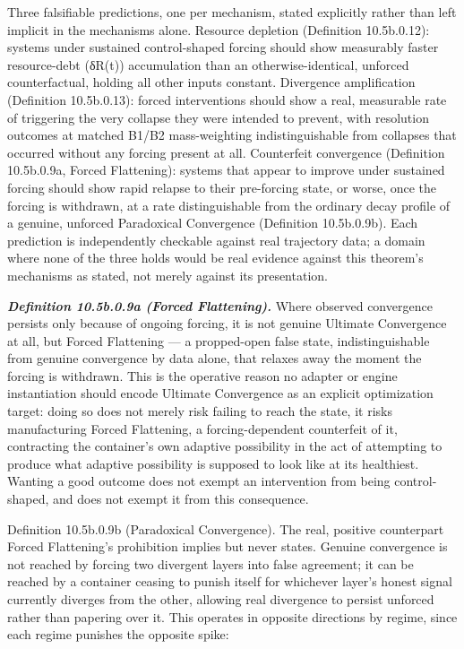 \documentclass[
]{article}
\begin{document}
Three falsifiable predictions, one per mechanism, stated explicitly
rather than left implicit in the mechanisms alone. Resource depletion
(Definition 10.5b.0.12): systems under sustained control-shaped forcing
should show measurably faster resource-debt (δR(t)) accumulation than an
otherwise-identical, unforced counterfactual, holding all other inputs
constant. Divergence amplification (Definition 10.5b.0.13): forced
interventions should show a real, measurable rate of triggering the very
collapse they were intended to prevent, with resolution outcomes at
matched B1/B2 mass-weighting indistinguishable from collapses that
occurred without any forcing present at all. Counterfeit convergence
(Definition 10.5b.0.9a, Forced Flattening): systems that appear to
improve under sustained forcing should show rapid relapse to their
pre-forcing state, or worse, once the forcing is withdrawn, at a rate
distinguishable from the ordinary decay profile of a genuine, unforced
Paradoxical Convergence (Definition 10.5b.0.9b). Each prediction is
independently checkable against real trajectory data; a domain where
none of the three holds would be real evidence against this theorem's
mechanisms as stated, not merely against its presentation.

\emph{\textbf{Definition 10.5b.0.9a (Forced Flattening).}} Where
observed convergence persists only because of ongoing forcing, it is not
genuine Ultimate Convergence at all, but Forced Flattening --- a
propped-open false state, indistinguishable from genuine convergence by
data alone, that relaxes away the moment the forcing is withdrawn. This
is the operative reason no adapter or engine instantiation should encode
Ultimate Convergence as an explicit optimization target: doing so does
not merely risk failing to reach the state, it risks manufacturing
Forced Flattening, a forcing-dependent counterfeit of it, contracting
the container's own adaptive possibility in the act of attempting to
produce what adaptive possibility is supposed to look like at its
healthiest. Wanting a good outcome does not exempt an intervention from
being control-shaped, and does not exempt it from this consequence.

Definition 10.5b.0.9b (Paradoxical Convergence). The real, positive
counterpart Forced Flattening's prohibition implies but never states.
Genuine convergence is not reached by forcing two divergent layers into
false agreement; it can be reached by a container ceasing to punish
itself for whichever layer's honest signal currently diverges from the
other, allowing real divergence to persist unforced rather than papering
over it. This operates in opposite directions by regime, since each
regime punishes the opposite spike:
\end{document}
